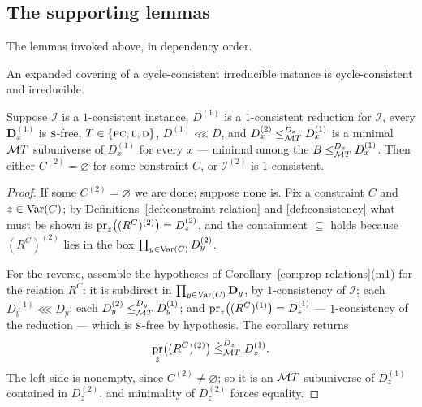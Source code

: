 \subsection{The supporting lemmas}

The lemmas invoked above, in dependency order.

\begin{lemma}\label{lem:expanded-consistency}
An expanded covering of a cycle-consistent irreducible instance is
cycle-consistent and irreducible.
\end{lemma}

\begin{lemma}\label{lem:minimal-consistent}
Suppose $\mathcal I$ is a $1$-consistent instance, $D^{(1)}$ is a
$1$-consistent reduction for $\mathcal I$, every
$\mathbf D^{(1)}_{x}$ is $\TS$-free, $T\in\{\TPC,\TL,\TD\}$, $D^{(1)}\lll D$,
and $D^{(2)}_{x}\subte[D_{x}]{\MT T}D^{(1)}_{x}$ is a minimal $\MT T$
subuniverse of $D^{(1)}_{x}$ for every $x$ --- minimal among the
$B\subte[D_{x}]{\MT T}D^{(1)}_{x}$. Then either $C^{(2)}=\varnothing$ for
some constraint $C$, or $\mathcal I^{(2)}$ is $1$-consistent.
\end{lemma}

\begin{proof}
If some $C^{(2)}=\varnothing$ we are done; suppose none is. Fix a constraint
$C$ and $z\in\Var(C)$; by Definitions~\ref{def:constraint-relation} and
\ref{def:consistency} what must be shown is
$\proj_{z}\bigl((R^{C})^{(2)}\bigr)=D^{(2)}_{z}$, and the containment
$\subseteq$ holds because $(R^{C})^{(2)}$ lies in the box
$\prod_{y\in\Var(C)}D^{(2)}_{y}$.

For the reverse, assemble the hypotheses of
Corollary~\ref{cor:prop-relations}(m1) for the relation $R^{C}$: it is
subdirect in $\prod_{y\in\Var(C)}\mathbf D_{y}$, by $1$-consistency of
$\mathcal I$; each $D^{(1)}_{y}\lll D_{y}$; each
$D^{(2)}_{y}\subte[D_{y}]{\MT T}D^{(1)}_{y}$; and
$\proj_{z}\bigl((R^{C})^{(1)}\bigr)=D^{(1)}_{z}$ --- $1$-consistency of the
reduction --- which is $\TS$-free by hypothesis. The corollary returns
\[
  \proj_{z}\bigl((R^{C})^{(2)}\bigr)
  \;\dsubte[D_{z}]{\MT T}\;D^{(1)}_{z} .
\]
The left side is nonempty, since $C^{(2)}\neq\varnothing$; so it is an
$\MT T$ subuniverse of $D^{(1)}_{z}$ contained in $D^{(2)}_{z}$, and
minimality of $D^{(2)}_{z}$ forces equality.
\end{proof}

